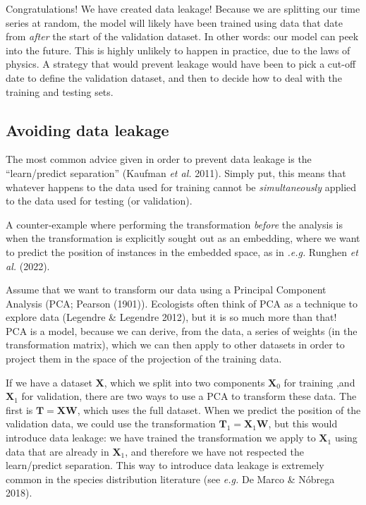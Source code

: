 \documentclass[
  letterpaper,
]{scrbook}
\begin{document}
Congratulations! We have created data leakage! Because we are splitting
our time series at random, the model will likely have been trained using
data that date from \emph{after} the start of the validation dataset. In
other words: our model can peek into the future. This is highly unlikely
to happen in practice, due to the laws of physics. A strategy that would
prevent leakage would have been to pick a cut-off date to define the
validation dataset, and then to decide how to deal with the training and
testing sets.

\subsection{Avoiding data leakage}\label{sec-leakage-avoid}

The most common advice given in order to prevent data leakage is the
``learn/predict separation'' (Kaufman \emph{et al.} 2011). Simply put,
this means that whatever happens to the data used for training cannot be
\emph{simultaneously} applied to the data used for testing (or
validation).

A counter-example where performing the transformation \emph{before} the
analysis is when the transformation is explicitly sought out as an
embedding, where we want to predict the position of instances in the
embedded space, as in \emph{.e.g.} Runghen \emph{et al.} (2022).

Assume that we want to transform our data using a Principal Component
Analysis (PCA; Pearson (1901)). Ecologists often think of PCA as a
technique to explore data (Legendre \& Legendre 2012), but it is so much
more than that! PCA is a model, because we can derive, from the data, a
series of weights (in the transformation matrix), which we can then
apply to other datasets in order to project them in the space of the
projection of the training data.

If we have a dataset \(\mathbf{X}\), which we split into two components
\(\mathbf{X}_0\) for training ,and \(\mathbf{X}_1\) for validation,
there are two ways to use a PCA to transform these data. The first is
\(\mathbf{T} = \mathbf{X}\mathbf{W}\), which uses the full dataset. When
we predict the position of the validation data, we could use the
transformation \(\mathbf{T}_1 = \mathbf{X}_1\mathbf{W}\), but this would
introduce data leakage: we have trained the transformation we apply to
\(\mathbf{X}_1\) using data that are already in \(\mathbf{X}_1\), and
therefore we have not respected the learn/predict separation. This way
to introduce data leakage is extremely common in the species
distribution literature (see \emph{e.g.} De Marco \& Nóbrega 2018).
\end{document}
